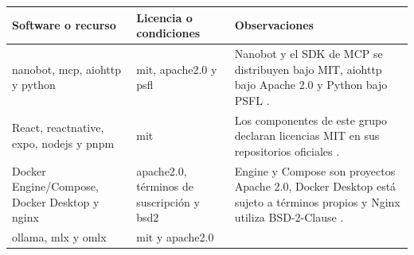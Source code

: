 \begin{table}[p]
    \centering
    \scriptsize
    \renewcommand{\arraystretch}{1.15}
    \begin{tabularx}{\textwidth}{
            |>{\raggedright\arraybackslash}p{3.6cm}
            |>{\raggedright\arraybackslash}p{3.1cm}
            |>{\raggedright\arraybackslash}X|
        }
        \hline
        \textbf{Software o recurso} & \textbf{Licencia o condiciones}                                                                                                                                                                                                                                                                                              & \textbf{Observaciones} \\ \hline
        \Gls{nanobot}, \gls{mcp}, \gls{aiohttp} y \gls{python}
                                    & \gls{mit}, \gls{apache2.0} y \gls{psfl}
                                    & Nanobot y el SDK de MCP se distribuyen bajo MIT, aiohttp bajo Apache 2.0 y Python bajo PSFL \cite{nanobot2026,mcpPythonSdk2026,aiohttpLicense2026,pythonLicense2026}.                                                                                                                                                                                 \\ \hline
        React, \gls{reactnative}, \gls{expo}, \gls{nodejs} y \gls{pnpm}
                                    & \gls{mit}
                                    & Los componentes de este grupo declaran licencias MIT en sus repositorios oficiales \cite{react2026,meta2024reactnative,expo2024,nodejs2026,pnpm2026}.                                                                                                                                                                                                 \\ \hline
        Docker Engine/Compose, Docker Desktop y \gls{nginx}
                                    & \gls{apache2.0}, términos de suscripción y \gls{bsd2}
                                    & Engine y Compose son proyectos Apache 2.0, Docker Desktop está sujeto a términos propios y Nginx utiliza BSD-2-Clause \cite{dockerEngineLicense2026,dockerComposeLicense2026,dockerDesktopTerms2026,nginxLicense2026}.                                                                                                                                \\ \hline
        \Gls{ollama}, \gls{mlx} y \gls{omlx}
                                    & \gls{mit} y \gls{apache2.0}

\end{tabularx}
\end{table}
